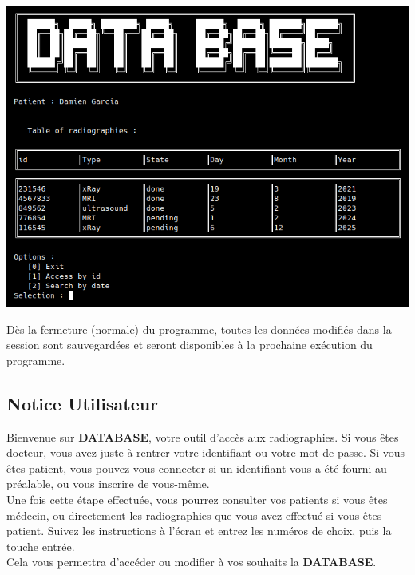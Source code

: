 \documentclass[12pt,a4paper]{article}
\newenvironment{Figure}
{\par\medskip\noindent\minipage{\linewidth}}
{\endminipage\par\medskip}
\begin{document}
\begin{multicols}{2}
		\begin{Figure}
			\centering
			\includegraphics[width=\linewidth]{images/walkthrough/patient_main.png}
			\label{fig:radio_menu}
		\end{Figure}
		
		Dès la fermeture (normale) du programme, toutes les données modifiés dans la session sont sauvegardées et seront disponibles à la prochaine exécution du programme. \\
		
		\begin{tcolorbox}
		\subsection{Notice Utilisateur}

			Bienvenue sur \textbf{DATABASE}, votre outil d'accès aux radiographies. Si vous êtes docteur, vous avez juste à rentrer votre identifiant ou votre mot de passe. Si vous êtes patient, vous pouvez vous connecter si un identifiant vous a été fourni au préalable, ou vous inscrire de vous-même. \\
			
			Une fois cette étape effectuée, vous pourrez consulter vos patients si vous êtes médecin, ou directement les radiographies que vous avez effectué si vous êtes patient. Suivez les instructions à l'écran et entrez les numéros de choix, puis la touche entrée. \\
			
			Cela vous permettra d'accéder ou modifier à vos souhaits la \textbf{DATABASE}.
		\end{tcolorbox}


\end{multicols}
\end{document}
